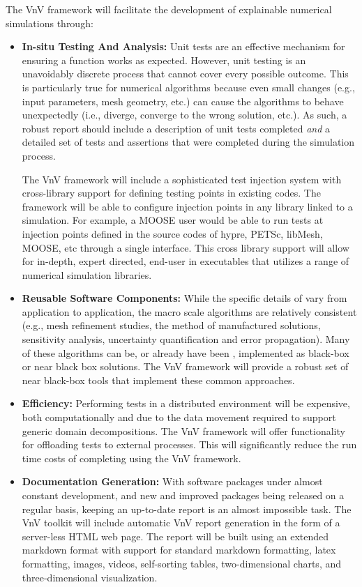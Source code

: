 The VnV framework will facilitate the development of explainable numerical simulations through:

\begin{itemize}
 
 \item{ \bf In-situ Testing And Analysis:} Unit tests are an effective mechanism for ensuring a function works as expected. However, unit testing is an unavoidably discrete process that cannot cover every possible outcome. This is particularly true for numerical algorithms because even small changes (e.g., input parameters, mesh geometry, etc.) can cause the algorithms to behave unexpectedly (i.e., diverge, converge to the wrong solution, etc.). As such, a robust \VV report should include a description of unit tests completed \emph{and} a detailed set of tests and assertions that were completed during the simulation process. 
 
 The VnV framework will include a sophisticated test injection system with cross-library support for defining testing points in existing codes. The framework will be able to configure injection points in any library linked to a simulation. For example, a MOOSE user would be able to run \VV tests at injection points defined in the source codes of hypre, PETSc, libMesh, MOOSE, etc through a single interface. This cross library support will allow for in-depth, expert directed, end-user \VV in executables that utilizes a range of numerical simulation libraries. 
 
 \item {\bf Reusable Software Components:} While the specific details of \VV vary from application to application, the macro scale algorithms are relatively consistent (e.g., mesh refinement studies, the method of manufactured solutions, sensitivity analysis, uncertainty quantification and error propagation). Many of these algorithms can be, or already have been \cite{DAKOTA},  implemented as black-box or near black box solutions. The VnV framework will provide a robust set of near black-box tools that implement these common \VV approaches. 
  
 \item{\bf Efficiency:}  Performing \VV tests in a distributed environment will be expensive, both computationally and due to the data movement required to support generic domain decompositions. The VnV framework will offer functionality for offloading tests to external processes. This will significantly reduce the run time costs of completing \VV using the VnV framework.
 
 \item{\bf Documentation Generation:} With software packages under almost constant development, and new and improved packages being released on a regular basis, keeping an up-to-date \VV report is an almost impossible task. The VnV toolkit will include automatic VnV report generation in the form of a server-less HTML web page. The report will be built using an extended markdown format with support for standard markdown formatting, latex formatting, images, videos, self-sorting tables, two-dimensional charts, and three-dimensional visualization. 
 \end{itemize}

